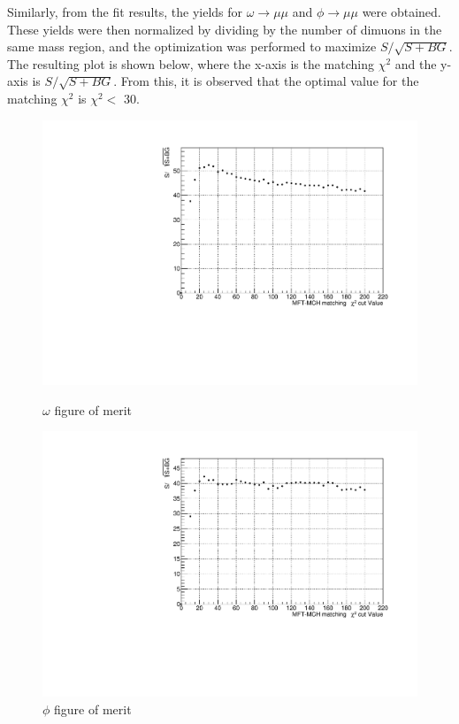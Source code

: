             Similarly, from the fit results, the yields for $\omega \rightarrow \mu\mu$ and $\phi \rightarrow \mu\mu$ were obtained. These yields were then normalized by dividing by the number of dimuons in the same mass region, and the optimization was performed to maximize $S/\sqrt{S+BG}$. The resulting plot is shown below, where the x-axis is the matching $\chi^2$ and the y-axis is $S/\sqrt{S+BG}$. From this, it is observed that the optimal value for the matching $\chi^2$ is $\chi^2 <$ 30.

            \begin{figure}[htbp]
                \centering
                \begin{minipage}{0.45\textwidth} %
                    \centering
                    \includegraphics[width=\textwidth]{fig/3_4_4_omega_significance.pdf} %
                    \caption{$\omega$ figure of merit}
                    \label{fig:omega_significance}
                \end{minipage}
                \hfill
                \begin{minipage}{0.45\textwidth}
                    \centering
                    \includegraphics[width=\textwidth]{fig/3_4_4_phi_significance.pdf} %
                    \caption{$\phi$ figure of merit}
                    \label{fig:phi_significance}
                \end{minipage}
            \end{figure}
